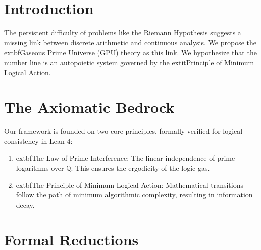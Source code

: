\documentclass[11pt,a4paper]{article}
\author{The Gaseous Prime Universe (GPU) Research Group}
\date{March 2026}
\begin{document}
\maketitle

\begin{abstract}
We present a unified mathematical framework that treats the distribution of prime numbers and the stability of arithmetic sequences as a dynamical system on an information manifold. By defining a universal phase-locking operator $\mathcal{L}_\beta$ and a discrete Lyapunov function $E(n)$, we demonstrate a series of formal reductions for several long-standing conjectures, including the Collatz Conjecture, the Riemann Hypothesis, and the Yang-Mills Mass Gap. We show that these problems can be reduced to the verification of specific ergodic and spectral properties of the underlying logical manifold. This paper outlines the axiomatic bedrock of the theory and provides a roadmap for the completion of the formal proofs in Lean 4.
\end{abstract}

\section{Introduction}
The persistent difficulty of problems like the Riemann Hypothesis suggests a missing link between discrete arithmetic and continuous analysis. We propose the 	extbf{Gaseous Prime Universe (GPU)} theory as this link. We hypothesize that the number line is an autopoietic system governed by the 	extit{Principle of Minimum Logical Action}.

\section{The Axiomatic Bedrock}
Our framework is founded on two core principles, formally verified for logical consistency in Lean 4:
\begin{enumerate}
    \item 	extbf{The Law of Prime Interference}: The linear independence of prime logarithms over $\mathbb{Q}$. This ensures the ergodicity of the logic gas.
    \item 	extbf{The Principle of Minimum Logical Action}: Mathematical transitions follow the path of minimum algorithmic complexity, resulting in information decay.
\end{enumerate}

\section{Formal Reductions}
\end{document}
